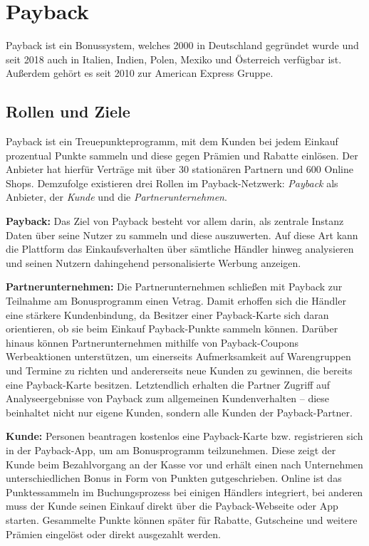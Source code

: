 \section{Payback} \label{Payback}
Payback ist ein Bonussystem, welches 2000 in Deutschland gegründet wurde und seit 2018 auch in Italien, Indien, Polen, Mexiko und Österreich verfügbar ist. Außerdem gehört es seit 2010 zur American Express Gruppe. \cite{Payback_Info}

\subsection{Rollen und Ziele}
Payback ist ein Treuepunkteprogramm, mit dem Kunden bei jedem Einkauf prozentual Punkte sammeln und diese gegen Prämien und Rabatte einlösen. Der Anbieter hat hierfür Verträge mit über 30 stationären Partnern und 600 Online Shops. \cite{Payback} Demzufolge existieren drei Rollen im Payback-Netzwerk: \textit{Payback} als Anbieter, der \textit{Kunde} und die \textit{Partnerunternehmen}. \newline

\noindent \textbf{Payback:} Das Ziel von Payback besteht vor allem darin, als zentrale Instanz Daten über seine Nutzer zu sammeln und diese auszuwerten. Auf diese Art kann die Plattform das Einkaufsverhalten über sämtliche Händler hinweg analysieren und seinen Nutzern dahingehend personalisierte Werbung anzeigen. \newline

\noindent \textbf{Partnerunternehmen:} Die Partnerunternehmen schließen mit Payback zur Teilnahme am Bonusprogramm einen Vetrag. Damit erhoffen sich die Händler eine stärkere Kundenbindung, da Besitzer einer Payback-Karte sich daran orientieren, ob sie beim Einkauf Payback-Punkte sammeln können. Darüber hinaus können Partnerunternehmen mithilfe von Payback-Coupons Werbeaktionen unterstützen, um einerseits Aufmerksamkeit auf Warengruppen und Termine zu richten und andererseits neue Kunden zu gewinnen, die bereits eine Payback-Karte besitzen. Letztendlich erhalten die Partner Zugriff auf Analyseergebnisse von Payback zum allgemeinen Kundenverhalten -- diese beinhaltet nicht nur eigene Kunden, sondern alle Kunden der Payback-Partner. \newline

\noindent \textbf{Kunde:} Personen beantragen kostenlos eine Payback-Karte bzw. registrieren sich in der Payback-App, um am Bonusprogramm teilzunehmen. Diese zeigt der Kunde beim Bezahlvorgang an der Kasse vor und erhält einen nach Unternehmen unterschiedlichen Bonus in Form von Punkten gutgeschrieben. Online ist das Punktessammeln im Buchungsprozess bei einigen Händlers integriert, bei anderen muss der Kunde seinen Einkauf direkt über die Payback-Webseite oder App starten. Gesammelte Punkte können später für Rabatte, Gutscheine und weitere Prämien eingelöst oder direkt ausgezahlt werden.

